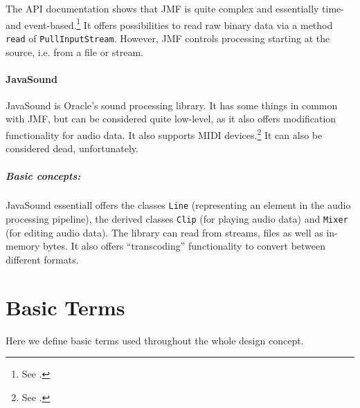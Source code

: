 The API documentation shows that JMF is quite complex and essentially time- and event-based.\footnote{See \cite{JMFDoc}.} It offers possibilities to read raw binary data via a method \texttt{read} of \texttt{PullInputStream}. However, JMF controls processing starting at the source, i.e. from a file or stream.


\subsubsection{JavaSound}
\label{sec:JavaSound}

JavaSound is Oracle's sound processing library. It has some things in common with  JMF, but can be considered quite low-level, as it also offers modification functionality for audio data. It also supports MIDI devices.\footnote{See \cite{WikJavaSound}.} It can also be considered dead, unfortunately.


\paragraph{Basic concepts:}
\label{sec:BasicConcepts}

JavaSound essentiall offers the classes \texttt{Line} (representing an element in the audio processing pipeline), the derived classes \texttt{Clip} (for playing audio data) and \texttt{Mixer} (for editing audio data). The library can read from streams, files as well as in-memory bytes. It also offers ``transcoding'' functionality to convert between different formats.


\chapter{Basic Terms}
\label{sec:BasicTerms}

Here we define basic terms used throughout the whole design concept.


